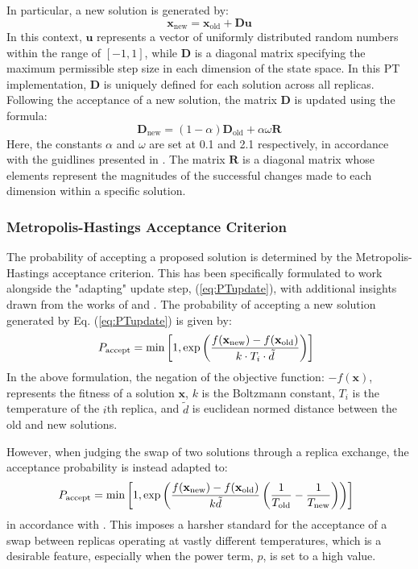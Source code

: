 \documentclass[10pt]{article}
\begin{document}
\begin{multicols}{2}
In particular, a new solution is generated by:
\begin{equation}
\mathbf{x}_{\text{new}} = \mathbf{x}_{\text{old}} + \mathbf{D}\mathbf{u}
\label{eq:PTupdate}
\end{equation}
In this context, $\mathbf{u}$ represents a vector of uniformly distributed random numbers within the range of $[-1, 1]$, while $\mathbf{D}$ is a diagonal matrix specifying the maximum permissible step size in each dimension of the state space. In this PT implementation, $\mathbf{D}$ is uniquely defined for each solution across all replicas. Following the acceptance of a new solution, the matrix $\mathbf{D}$ is updated using the formula:
\[
\mathbf{D}_{\text{new}} = (1-\alpha)\mathbf{D}_{\text{old}} + \alpha \omega \mathbf{R}
\]
Here, the constants $\alpha$ and $\omega$ are set at 0.1 and 2.1 respectively, in accordance with the guidlines presented in \cite{NT90-A34350}. The matrix $\mathbf{R}$ is a diagonal matrix whose elements represent the magnitudes of the successful changes made to each dimension within a specific solution.

\subsubsection{Metropolis-Hastings Acceptance Criterion}
\label{sec:PT_MA}

The probability of accepting a proposed solution is determined by the Metropolis-Hastings acceptance criterion. This has been specifically formulated to work alongside the "adapting" update step, (\ref{eq:PTupdate}), with additional insights drawn from the works of \cite{NT90-A34350} and \cite{Neal_1996}. The probability of accepting a new solution generated by Eq. (\ref{eq:PTupdate}) is given by:
\[
    \hspace{-2mm}P_{\text{accept}} = \min\left[1, \exp\left(\frac{f(\mathbf{x_{\text{new}}}) - f(\mathbf{x_{\text{old}}})}{k \cdot T_i \cdot \tilde{d}}\right)\right]
\]
In the above formulation, the negation of the objective function: $-f(\mathbf{x})$, represents the fitness of a solution $\mathbf{x}$, $k$ is the Boltzmann constant, $T_i$ is the temperature of the $i$th replica, and $\tilde{d}$ is euclidean normed distance between the old and new solutions.

However, when judging the swap of two solutions through a replica exchange, the acceptance probability is instead adapted to:
\[
    \hspace{-2mm}P_{\text{accept}} = \min\left[1, \exp\left(\frac{f(\mathbf{x_{\text{new}}}) - f(\mathbf{x_{\text{old}}})}{k \tilde{d}} \left(\frac{1}{T_{\text{old}}} - \frac{1}{T_{\text{new}}}\right)\right)\right]
\]
in accordance with \cite{Neal_1996}. This imposes a harsher standard for the acceptance of a swap between replicas operating at vastly different temperatures, which is a desirable feature, especially when the power term, $p$, is set to a high value.


\end{multicols}
\end{document}
